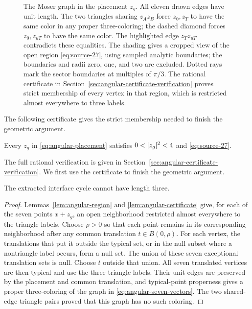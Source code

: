 \begin{figure}[htbp]
\centering

\caption{The Moser graph in the placement $z_g$. All eleven drawn edges
have unit length. The two triangles sharing $z_Az_B$ force $z_0,z_T$
to have the same color in any proper three-coloring; the dashed diamond forces
$z_0,z_{uT}$ to have the same color. The highlighted edge $z_Tz_{uT}$
contradicts these equalities. The shading gives a cropped view of the open
region \eqref{eq:source-27}, using sampled analytic boundaries; the
boundaries and radii zero, one, and two are excluded. Dotted rays mark
the sector boundaries at multiples of \(\pi/3\).
The rational certificate in Section~\ref{sec:angular-certificate-verification}
proves strict membership of every vertex in that region, which is
restricted almost everywhere to three labels.}
\label{fig:moser-placement}
\end{figure}

The following certificate gives the strict membership needed to finish
the geometric argument.

\begin{lemma}\label{lem:angular-certificate}
Every \(z_g\) in \eqref{eq:angular-placement} satisfies
\(0<\lvert z_g\rvert^2<4\) and \eqref{eq:source-27}.
\end{lemma}

The full rational verification is given in
Section~\ref{sec:angular-certificate-verification}.  We first use the
certificate to finish the geometric argument.

\begin{proposition}\label{prop:angular-three}
The extracted interface cycle cannot have length three.
\end{proposition}

\begin{proof}
Lemmas~\ref{lem:angular-region} and \ref{lem:angular-certificate}
give, for each of the seven points \(x+z_g\), an open
neighborhood restricted almost everywhere to the triangle
labels.  Choose \(\rho>0\) so that each point remains in
its corresponding neighborhood after any common translation
\(t\in B(0,\rho)\).  For each vertex, the translations
that put it outside the typical set, or in the null subset
where a nontriangle label occurs, form a null set.  The
union of these seven exceptional translation sets is null.
Choose \(t\) outside that union.  All seven translated
vertices are then typical and use the three triangle labels.
Their unit edges are preserved by the placement and common
translation, and typical-point properness gives a proper
three-coloring of the graph in
\eqref{eq:angular-seven-vectors}.  The two shared-edge
triangle pairs proved that this graph has no such coloring.
\end{proof}

